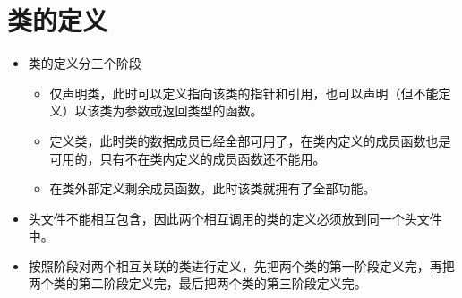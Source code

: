 \section{类的定义}
\begin{itemize}
	\item 类的定义分三个阶段
	\begin{itemize}
		\item 仅声明类，此时可以定义指向该类的指针和引用，也可以声明（但不能定义）以该类为参数或返回类型的函数。
		\item 定义类，此时类的数据成员已经全部可用了，在类内定义的成员函数也是可用的，只有不在类内定义的成员函数还不能用。
		\item 在类外部定义剩余成员函数，此时该类就拥有了全部功能。
	\end{itemize}
	\item 头文件不能相互包含，因此两个相互调用的类的定义必须放到同一个头文件中。
	\item 按照阶段对两个相互关联的类进行定义，先把两个类的第一阶段定义完，再把两个类的第二阶段定义完，最后把两个类的第三阶段定义完。
	
	
\end{itemize}

